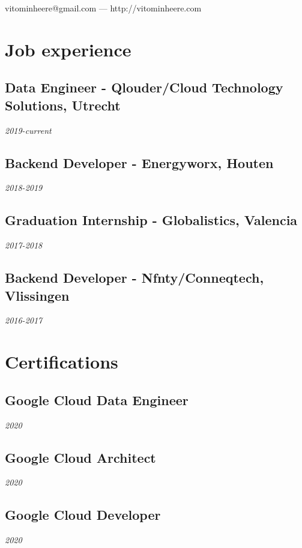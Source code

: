 \documentclass{article}
\makeatletter
\renewcommand{\maketitle}{
\begin{center}
	{\huge\bfseries
	\theauthor}

\vspace*{1cm}
vitominheere@gmail.com --- http://vitominheere.com

\end{center}
}
\makeatother
\begin{document}
\author{Vito Minheere}


\maketitle

\section{\sc Job experience}
\subsection{Data Engineer - Qlouder/Cloud Technology Solutions, Utrecht} \hfill {\em 2019-current} \\

\subsection{Backend Developer - Energyworx, Houten} \hfill {\em 2018-2019} \\

\subsection{Graduation Internship - Globalistics, Valencia} \hfill {\em 2017-2018} \\

\subsection{Backend Developer - Nfnty/Conneqtech, Vlissingen} \hfill {\em 2016-2017} \\

\section{Certifications}
\subsection{Google Cloud Data Engineer}\hfill {\em 2020} \\
\subsection{Google Cloud Architect}\hfill {\em 2020} \\
\subsection{Google Cloud Developer}\hfill {\em 2020} \\
\end{document}
